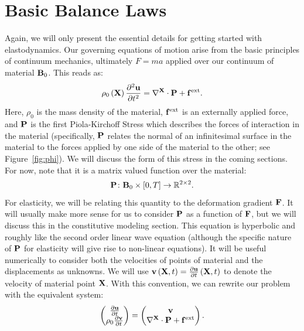 \section{Basic Balance Laws}

Again, we will only present the essential details for getting started with elastodynamics. Our governing equations of motion arise from the basic principles of continuum mechanics, ultimately $F = ma$ applied over our continuum of material $\mathbf{B}_0$. This reads as:
\begin{equation*}
\rho_0 \left( \mathbf{X} \right) \frac{\partial^2 \mathbf{u}}{\partial t^2} = \nabla^{\mathbf{X}} \cdot \mathbf{P} + \mathbf{f}^{\text{ext}}.
\end{equation*}
Here, $\rho_0$ is the mass density of the material, $\mathbf{f}^\text{ext}$ is an externally applied force, and $\mathbf{P}$ is the first Piola-Kirchoff Stress which describes the forces of interaction in the material (specifically, $\mathbf{P}$ relates the normal of an infinitesimal surface in the material to the forces applied by one side of the material to the other; see Figure~\ref{fig:phi}). We will discuss the form of this stress in the coming sections. For now, note that it is a matrix valued function over the material:
\begin{equation*}
\mathbf{P} \colon \mathbf{B}_0 \times [0,T] \to \mathbb{R}^{2\times2}.
\end{equation*}
For elasticity, we will be relating this quantity to the deformation gradient $\mathbf{F}$. It will usually make more sense for us to consider $\mathbf{P}$ as a function of $\mathbf{F}$, but we will discuss this in the constitutive modeling section. This equation is hyperbolic and roughly like the second order linear wave equation (although the specific nature of $\mathbf{P}$ for elasticity will give rise to non-linear equations). It will be useful numerically to consider both the velocities of points of material and the displacements as unknowns. We will use $\mathbf{v} \left( \mathbf{X}, t \right) = \frac{\partial\mathbf{u}}{\partial t} \left( \mathbf{X}, t \right)$ to denote the velocity of material point $\mathbf{X}$. With this convention, we can rewrite our problem with the equivalent system:
\begin{equation*}
\begin{pmatrix}
\frac{\partial\mathbf{u}}{\partial t} \\
\rho_0 \frac{\partial\mathbf{v}}{\partial t}
\end{pmatrix}
= \begin{pmatrix}
\mathbf{v} \\
\nabla^{\mathbf{X}} \cdot \mathbf{P} + \mathbf{f}^{\text{ext}}
\end{pmatrix}.
\end{equation*}

